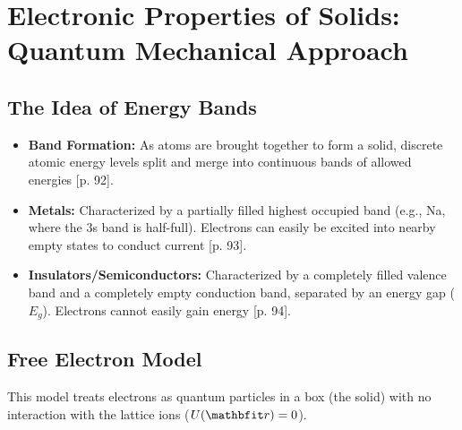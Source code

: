 \documentclass[a4paper,oneside,article]{memoir}
\begin{document}
\chapter{Electronic Properties of Solids: Quantum Mechanical Approach}

\section{The Idea of Energy Bands}
\begin{itemize}
    \item \textbf{Band Formation:} As atoms are brought together to form a solid, discrete atomic energy levels split and merge into continuous bands of allowed energies [p. 92].
    \item \textbf{Metals:} Characterized by a partially filled highest occupied band (e.g., Na, where the 3s band is half-full). Electrons can easily be excited into nearby empty states to conduct current [p. 93].
    \item \textbf{Insulators/Semiconductors:} Characterized by a completely filled valence band and a completely empty conduction band, separated by an energy gap ($E_g$). Electrons cannot easily gain energy [p. 94].
\end{itemize}

\section{Free Electron Model}
This model treats electrons as quantum particles in a box (the solid) with no interaction with the lattice ions ($U(\v{r})=0$).
\end{document}
